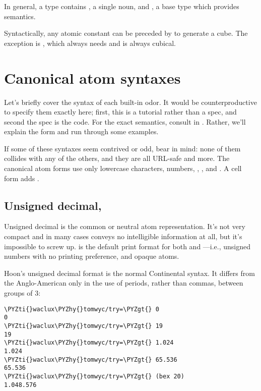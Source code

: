 In general, a  type contains , a single noun, and ,
a base type which provides semantics.

Syntactically, any atomic constant can be preceded by \kode{\%} to
generate a cube.  The exception is , which always needs \kode{\%}
and is always cubical.

\section{Canonical atom syntaxes}

Let's briefly cover the syntax of each built-in odor.  It would
be counterproductive to specify them exactly here; first, this is
a tutorial rather than a spec, and second the spec is the code.
For the exact semantics, consult  in .  Rather,
we'll explain the form and run through some examples.

If some of these syntaxes seem contrived or odd, bear in mind:
none of them collides with any of the others, and they are all
URL-safe and more.  The canonical atom forms use only lowercase
characters, numbers, , \kode{-}, and \kode{\textasciitilde}.  A cell form adds \kode{\_}.

\subsection{Unsigned decimal, }

Unsigned decimal is the common or neutral atom representation.
It's not very compact and in many cases conveys no intelligible
information at all, but it's impossible to screw up.   is
the default print format for both  and ---i.e., unsigned
numbers with no printing preference, and opaque atoms.

Hoon's unsigned decimal format is the normal Continental syntax.
It differs from the Anglo-American only in the use of periods,
rather than commas, between groups of 3:

\begin{framed_shaded}
\begin{Verbatim}[fontsize=\relsize{-2.5},fontseries=b,commandchars=\\\{\}]
\PYZti{}waclux\PYZhy{}tomwyc/try=\PYZgt{} 0
0
\PYZti{}waclux\PYZhy{}tomwyc/try=\PYZgt{} 19
19
\PYZti{}waclux\PYZhy{}tomwyc/try=\PYZgt{} 1.024
1.024
\PYZti{}waclux\PYZhy{}tomwyc/try=\PYZgt{} 65.536
65.536
\PYZti{}waclux\PYZhy{}tomwyc/try=\PYZgt{} (bex 20)
1.048.576
\end{Verbatim}
\end{framed_shaded}

